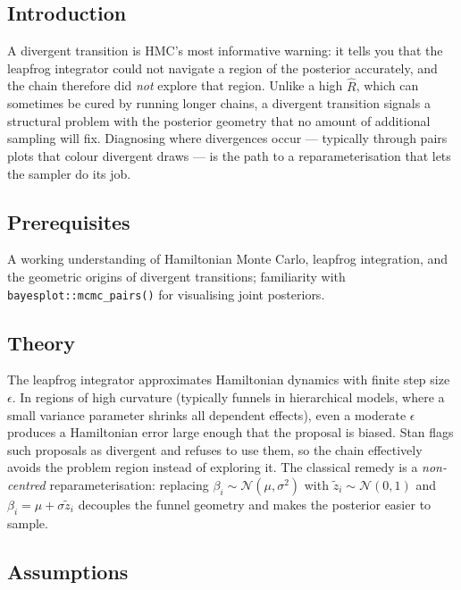 \documentclass[
]{article}
\author{}
\date{\vspace{-2.5em}}
\begin{document}
\subsection{Introduction}\label{introduction}

A divergent transition is HMC's most informative warning: it tells you
that the leapfrog integrator could not navigate a region of the
posterior accurately, and the chain therefore did \emph{not} explore
that region. Unlike a high \(\hat R\), which can sometimes be cured by
running longer chains, a divergent transition signals a structural
problem with the posterior geometry that no amount of additional
sampling will fix. Diagnosing where divergences occur --- typically
through pairs plots that colour divergent draws --- is the path to a
reparameterisation that lets the sampler do its job.

\subsection{Prerequisites}\label{prerequisites}

A working understanding of Hamiltonian Monte Carlo, leapfrog
integration, and the geometric origins of divergent transitions;
familiarity with \texttt{bayesplot::mcmc\_pairs()} for visualising joint
posteriors.

\subsection{Theory}\label{theory}

The leapfrog integrator approximates Hamiltonian dynamics with finite
step size \(\epsilon\). In regions of high curvature (typically funnels
in hierarchical models, where a small variance parameter shrinks all
dependent effects), even a moderate \(\epsilon\) produces a Hamiltonian
error large enough that the proposal is biased. Stan flags such
proposals as divergent and refuses to use them, so the chain effectively
avoids the problem region instead of exploring it. The classical remedy
is a \emph{non-centred} reparameterisation: replacing
\(\beta_i \sim \mathcal N(\mu, \sigma^2)\) with
\(\tilde z_i \sim \mathcal N(0, 1)\) and
\(\beta_i = \mu + \sigma \tilde z_i\) decouples the funnel geometry and
makes the posterior easier to sample.

\subsection{Assumptions}\label{assumptions}
\end{document}
